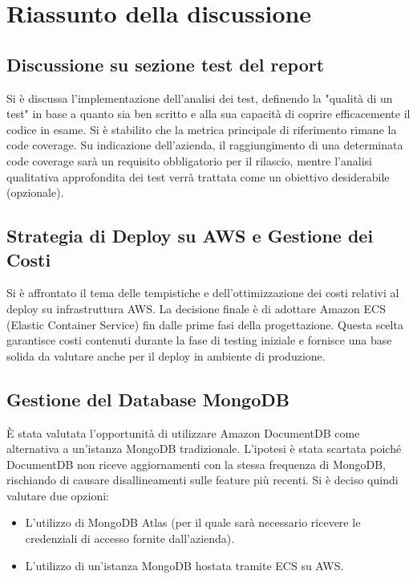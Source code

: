\documentclass[a4paper, 11pt]{article}
\begin{document}
\newpage

\section{Riassunto della discussione}

\subsection{Discussione su sezione test del report}
Si è discussa l'implementazione dell'analisi dei test, definendo la "qualità di un test" in base a quanto sia ben scritto e alla sua capacità di coprire efficacemente il codice in esame. Si è stabilito che la metrica principale di riferimento rimane la code coverage. Su indicazione dell'azienda, il raggiungimento di una determinata code coverage sarà un requisito obbligatorio per il rilascio, mentre l'analisi qualitativa approfondita dei test verrà trattata come un obiettivo desiderabile (opzionale).

\subsection{Strategia di Deploy su AWS e Gestione dei Costi}
Si è affrontato il tema delle tempistiche e dell'ottimizzazione dei costi relativi al deploy su infrastruttura AWS. La decisione finale è di adottare Amazon ECS (Elastic Container Service) fin dalle prime fasi della progettazione. Questa scelta garantisce costi contenuti durante la fase di testing iniziale e fornisce una base solida da valutare anche per il deploy in ambiente di produzione.

\subsection{Gestione del Database MongoDB}
È stata valutata l'opportunità di utilizzare Amazon DocumentDB come alternativa a un'istanza MongoDB tradizionale. L'ipotesi è stata scartata poiché DocumentDB non riceve aggiornamenti con la stessa frequenza di MongoDB, rischiando di causare disallineamenti sulle feature più recenti. Si è deciso quindi valutare due opzioni:
\begin{itemize}
    \item L'utilizzo di MongoDB Atlas (per il quale sarà necessario ricevere le credenziali di accesso fornite dall'azienda).
    \item L'utilizzo di un'istanza MongoDB hostata tramite ECS su AWS.
\end{itemize}
\end{document}
